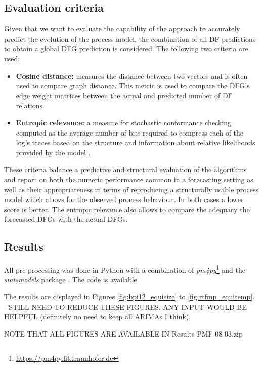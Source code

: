 \subsection{Evaluation criteria}
Given that we want to evaluate the capability of the approach to accurately predict the evolution of the process model, the combination of all DF predictions to obtain a global DFG prediction is considered.
The following two criteria are used:
\begin{itemize}
	\item \textbf{Cosine distance:} measures the distance between two vectors and is often used to compare graph distance. This metric is used to compare the DFG's edge weight matrices between the actual and predicted number of DF relations.
	\item \textbf{Entropic relevance:} a measure for stochastic conformance checking computed as the average number of bits required to compress each of the log’s traces based on the structure and information about relative likelihoods provided by the model \cite{DBLP:conf/icpm/PolyvyanyyMG20}.
\end{itemize}
These criteria balance a predictive and structural evaluation of the algorithms and report on both the numeric performance common in a forecasting setting as well as their appropriateness in terms of reproducing a structurally usable process model which allows for the observed process behaviour.
In both cases a lower score is better.
The entropic relevance also allows to compare the adequacy the forecasted DFGs with the actual DFGs.

\subsection{Results}
All pre-processing was done in Python with a combination of \emph{pm4py}\footnote{\url{https://pm4py.fit.fraunhofer.de}} and the \emph{statsmodels} package \cite{seabold2010statsmodels}. 
The code is available %

The results are displayed in Figures \ref{fig:bpi12_equisize} to \ref{fig:rtfmp_equitemp}. - STILL NEED TO REDUCE THESE FIGURES. ANY INPUT WOULD BE HELPFUL (definitely no need to keep all ARIMAs I think). 

NOTE THAT ALL FIGURES ARE AVAILABLE IN Results PMF 08-03.zip

